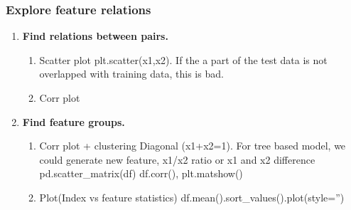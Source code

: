 \documentclass[11pt, twoside]{article}   	%
\begin{document}
\subsubsection{Explore feature relations}
    \begin{enumerate}
      \item  \textbf{Find relations between pairs.}
        \begin{enumerate}
          \item Scatter plot
            \indent plt.scatter(x1,x2). If the a part of the test data is not overlapped with training data, this is bad.
           \item Corr plot 
         \end{enumerate}
          
          \item  \textbf{Find feature groups. }
                  \begin{enumerate}
          \item Corr plot + clustering 
          \indent Diagonal (x1+x2=1). For tree based model, we could generate new feature, x1/x2 ratio or x1 and x2 difference
          \indent pd.scatter\_matrix(df)
          \indent  df.corr(), plt.matshow()
          \item Plot(Index vs feature statistics) 
            \indent  df.mean().sort\_values().plot(style='')          
         \end{enumerate}

          
    \end{enumerate}
\end{document}
